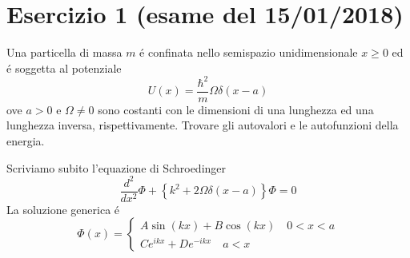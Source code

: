 \documentclass[a4paper]{article}
\begin{document}
    \section*{Esercizio 1 (esame del 15/01/2018)}
        Una particella di massa $m$ \'e confinata nello semispazio unidimensionale $x\geq0$ ed \'e soggetta al potenziale
        \begin{equation*}
            U(x)=\frac{\hbar^2}{m}\Omega\delta(x-a)
        \end{equation*}
        ove $a>0$ e $\Omega\neq0$ sono costanti con le dimensioni di una lunghezza ed una lunghezza inversa, rispettivamente. 
        Trovare gli autovalori e le autofunzioni della energia.
        \begin{figure}[H]
            \centering
        \end{figure}
        Scriviamo subito l'equazione di Schroedinger
        \begin{equation*}
            \frac{d^2}{dx^2}\Phi+\left\{k^2+2\Omega\delta(x-a)\right\}\Phi=0
        \end{equation*}
        La soluzione generica \'e
        \begin{equation*}
            \Phi(x)=
            \begin{cases}
                A\sin(kx)+B\cos(kx)\quad 0<x<a\\
                Ce^{ikx}+De^{-ikx}\quad a<x
            \end{cases}
        \end{equation*}
\end{document}
